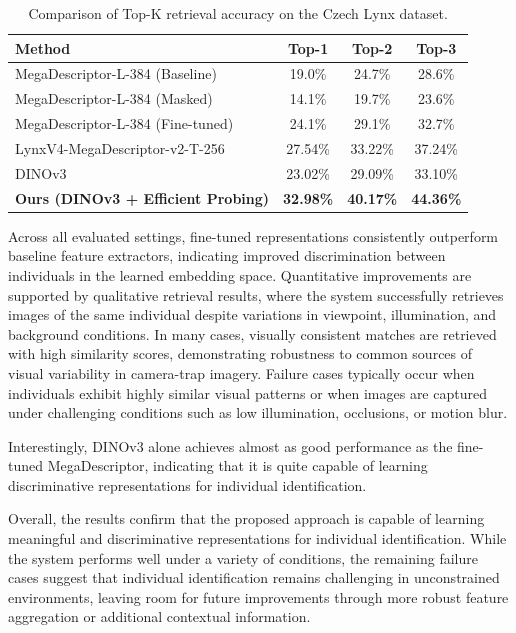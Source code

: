 \documentclass{article}
\begin{document}
\begin{table}[htbp]
    \centering
    \caption{Comparison of Top-K retrieval accuracy on the Czech Lynx dataset.}
    \label{tab:results}
    \begin{tabular}{lccc}
        \toprule
        \textbf{Method} & \textbf{Top-1} & \textbf{Top-2} & \textbf{Top-3} \\
        \midrule
        MegaDescriptor-L-384 (Baseline) & 19.0\% & 24.7\% & 28.6\% \\
        MegaDescriptor-L-384 (Masked) & 14.1\% & 19.7\% & 23.6\% \\
        MegaDescriptor-L-384 (Fine-tuned) & 24.1\% & 29.1\% & 32.7\% \\
        LynxV4-MegaDescriptor-v2-T-256 & 27.54\% & 33.22\% & 37.24\% \\
        DINOv3 & 23.02\% & 29.09\% & 33.10\% \\
        \textbf{Ours (DINOv3 + Efficient Probing)} & \textbf{32.98\%} & \textbf{40.17\%} & \textbf{44.36\%} \\
        \bottomrule
    \end{tabular}
\end{table}

Across all evaluated settings, fine-tuned representations consistently outperform baseline feature extractors, indicating improved discrimination between individuals in the learned embedding space. Quantitative improvements are supported by qualitative retrieval results, where the system successfully retrieves images of the same individual despite variations in viewpoint, illumination, and background conditions. In many cases, visually consistent matches are retrieved with high similarity scores, demonstrating robustness to common sources of visual variability in camera-trap imagery. Failure cases typically occur when individuals exhibit highly similar visual patterns or when images are captured under challenging conditions such as low illumination, occlusions, or motion blur.

Interestingly, DINOv3 alone achieves almost as good performance as the fine-tuned MegaDescriptor, indicating that it is quite capable of learning discriminative representations for individual identification. 

Overall, the results confirm that the proposed approach is capable of learning meaningful and discriminative representations for individual identification. While the system performs well under a variety of conditions, the remaining failure cases suggest that individual identification remains challenging in unconstrained environments, leaving room for future improvements through more robust feature aggregation or additional contextual information.
\end{document}
